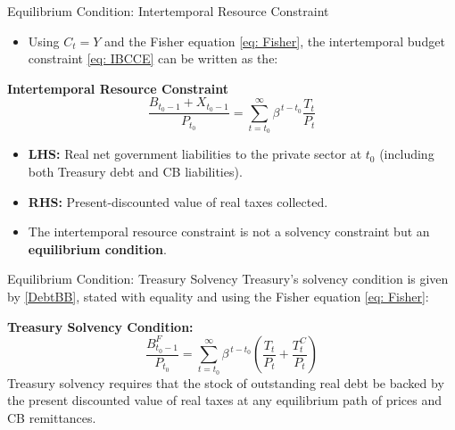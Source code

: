 \documentclass[11pt,aspectratio=169]{beamer}
\begin{document}
\begin{frame}{Equilibrium Condition: Intertemporal Resource Constraint}
\begin{itemize}
  \item Using $C_t=Y$ and the Fisher equation \eqref{eq: Fisher}, the intertemporal budget constraint \eqref{eq: IBCCE} can be written as the:
\end{itemize}
\noindent\textbf{Intertemporal Resource Constraint}
\vspace{0.25cm}
\begin{equation}
  \frac{B_{t_{0}-1} + X_{t_{0}-1}}{P_{t_{0}}}
  = \sum_{t=t_{0}}^{\infty} \beta^{\,t-t_{0}} \frac{T_t}{P_t}
  \label{eq: IBCTT}
\end{equation}

\vspace{0.25cm}
\begin{itemize}
  \item \textbf{LHS:} Real net government liabilities to the private sector at $t_0$ 
        (including both Treasury debt and CB liabilities).
  \item \textbf{RHS:} Present-discounted value of real taxes collected.
  \item The intertemporal resource constraint is not a solvency constraint but an \textbf{equilibrium condition}.  
\end{itemize}
\end{frame}

\begin{frame}{Equilibrium Condition: Treasury Solvency}
Treasury’s solvency condition is given by \eqref{DebtBB}, stated with equality and using the Fisher equation \eqref{eq: Fisher}:

\vspace{0.35cm}
\noindent\textbf{Treasury Solvency Condition:}
\begin{equation}
  \frac{B_{t_0-1}^{F}}{P_{t_0}}
  = \sum_{t=t_0}^{\infty} \beta^{\,t-t_0}
    \left(\frac{T_t}{P_t} + \frac{T_t^{C}}{P_t} \right)
    \label{eq: Treasury Solvency}
\end{equation}
\vspace{0.35cm}
\break
Treasury solvency requires that the stock of outstanding real debt be backed by the present discounted value of real taxes at any equilibrium path of prices and CB remittances.
\end{frame}
\end{document}
